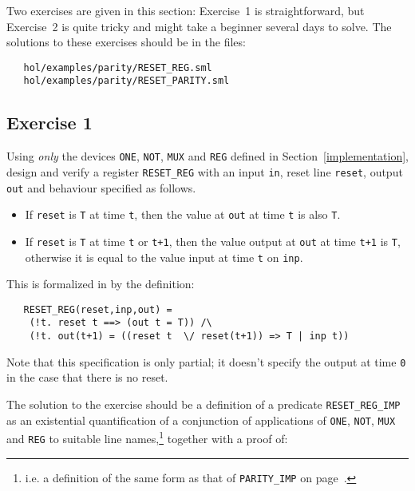 Two exercises are given in this section: Exercise~1 is
straightforward, but Exercise~2 is quite tricky and might take a
beginner several days to solve. The solutions to these exercises
should be in the files:

\begin{hol}\begin{verbatim}
   hol/examples/parity/RESET_REG.sml
   hol/examples/parity/RESET_PARITY.sml
\end{verbatim}\end{hol}


\subsection{Exercise 1}

Using {\it only\/} the devices {\small\verb|ONE|}, {\small\verb|NOT|},
{\small\verb|MUX|} and {\small\verb|REG|} defined in
Section~\ref{implementation}, design and verify a register
{\small\verb|RESET_REG|} with an input {\small\verb|in|}, reset line
{\small\verb|reset|}, output {\small\verb|out|} and behaviour
specified as follows.
\begin{itemize}
\item If {\small\verb|reset|} is {\small\verb|T|} at time
  {\small\verb|t|}, then the value at {\small\verb|out|} at time
  {\small\verb|t|} is also {\small\verb|T|}.
\item If {\small\verb|reset|} is {\small\verb|T|} at time
  {\small\verb|t|} or {\small\verb|t+1|}, then the value output at
  {\small\verb|out|} at time {\small\verb|t+1|} is {\small\verb|T|},
  otherwise it is equal to the value input at time {\small\verb|t|} on
  {\small\verb|inp|}.
\end{itemize}
This is formalized in \HOL{} by the definition:

{\small\begin{verbatim}
   RESET_REG(reset,inp,out) =
    (!t. reset t ==> (out t = T)) /\
    (!t. out(t+1) = ((reset t  \/ reset(t+1)) => T | inp t))
\end{verbatim}}

\noindent Note that this specification is only partial; it doesn't specify the
output at time {\small\verb|0|} in the case that there is no reset.

The solution to the exercise should be a definition of a predicate
{\small\verb|RESET_REG_IMP|} as an existential quantification of a
conjunction of applications of {\small\verb|ONE|}, {\small\verb|NOT|},
{\small\verb|MUX|} and {\small\verb|REG|} to suitable line
names,\footnote{i.e.  a definition of the same form as that of
  {\small\tt PARITY\_IMP}
on page~\pageref{parity-imp}.
} together with a proof of:

